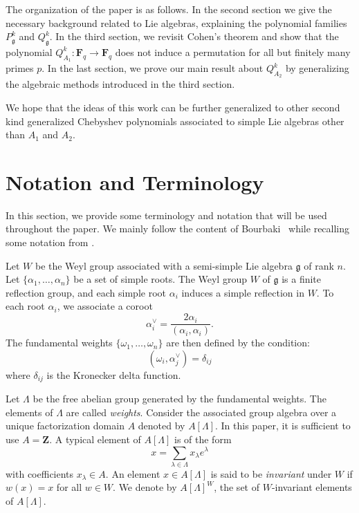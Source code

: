 \documentclass{amsart}
\newcommand{\mf}{\mathfrak}
\newcommand{\Z}{\mathbf Z}
\newcommand{\F}{\mathbf F}
\numberwithin{equation}{section}
\theoremstyle{plain}
\theoremstyle{definition}
\begin{document}
The organization of the paper is as follows. In the second section we give the necessary background related to Lie algebras, explaining the polynomial families $P_{\mf{g}}^k$ and $Q_{\mf{g}}^k$. In the third section, we revisit Cohen's theorem and show that the polynomial $Q_{A_1}^k:\F_q \rightarrow \F_q$ does not induce a permutation for all but finitely many primes $p$. In the last section, we prove our main result about $Q_{A_2}^k$ by generalizing the algebraic methods introduced in the third section.

We hope that the ideas of this work can be further generalized to other second kind generalized Chebyshev polynomials associated to simple Lie algebras other than $A_1$ and $A_2$. 





\section{Notation and Terminology}
In this section, we provide some terminology and notation that will be used throughout the paper. We mainly follow the content of Bourbaki~\cite[VI, $\S$3]{bourbaki2002} while recalling some notation from \cite{kuc10}.

Let $W$ be the Weyl group associated with a semi-simple Lie algebra $\mf{g}$ of rank $n$. Let $\{\alpha_1, \dots, \alpha_n\}$ be a set of simple roots. The Weyl group $W$ of $\mf{g}$ is a finite reflection group, and each simple root $\alpha_i$ induces a simple reflection in $W$. To each root $\alpha_i$, we associate a coroot
$$\alpha_i^\vee = \frac{2\alpha_i}{\left( \alpha_i, \alpha_i \right)}.$$
The fundamental weights $\{\omega_1, \dots, \omega_n\}$ are then defined by the condition:
\[ \left( \omega_i, \alpha_j^\vee \right) = \delta_{ij} \]
where $\delta_{ij}$ is the Kronecker delta function.

Let $\Lambda$ be the free abelian group generated by the fundamental weights. The elements of $\Lambda$ are called \textit{weights}. Consider the associated group algebra over a unique factorization domain $A$ denoted by $A[\Lambda]$. In this paper, it is sufficient to use $A=\Z$.  A typical element of $A[\Lambda]$ is of the form 
$$x=\sum_{\lambda \in \Lambda}x_\lambda e^\lambda$$ 
with coefficients $x_\lambda\in A$. An element $x \in A[\Lambda]$ is said to be \textit{invariant} under $W$ if
$w(x)= x$ for all $w \in W$. We denote by $A[\Lambda]^W$, the set of $W$-invariant elements of $A[\Lambda]$. 
\end{document}
